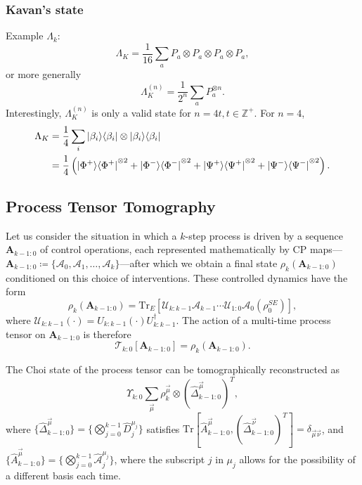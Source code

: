 \documentclass{article}
\begin{document}
\subsubsection{Kavan's state}
Example $\Lambda_k$:
\begin{equation}
    \Lambda_K = \frac{1}{16}\sum_a P_a \otimes P_a \otimes P_a \otimes P_a,
\end{equation}
or more generally
\begin{equation}
    \Lambda_K^{(n)}  = \frac{1}{2^n}\sum_a P_a^{\otimes n}.
\end{equation}
Interestingly, $\Lambda_K^{(n)}$ is only a valid state for $n = 4t, t\in \mathbb{Z^+}$. For $n=4$,
\begin{equation}
    \begin{split}
        \Lambda_K &= \frac{1}{4}\sum_i\ket{\beta_i}\!\bra{\beta_i}\otimes \ket{\beta_i}\!\bra{\beta_i} \\
        &= \frac{1}{4} \left(\ket{\Phi^+}\!\bra{\Phi^+}^{\otimes 2} + \ket{\Phi^-}\!\bra{\Phi^-}^{\otimes 2} + \ket{\Psi^+}\!\bra{\Psi^+}^{\otimes 2} + \ket{\Psi^-}\!\bra{\Psi^-}^{\otimes 2}\right).
    \end{split}
\end{equation}

\subsection{Process Tensor Tomography}
Let us consider the situation in which
a $k$-step process is driven by a sequence $\mathbf{A}_{k-1:0}$ of control operations, each represented mathematically by CP maps—$\mathbf{A}_{k-1:0} \coloneqq \{\mathcal{A}_0, \mathcal{A}_1,\dots, \mathcal{A}_k\}$—after which we obtain a final state $\rho_k(\mathbf{A}_{k-1:0})$ conditioned on this choice of interventions. These controlled dynamics have the form
$$
\rho_k(\mathbf{A}_{k-1:0}) = \text{Tr}_E[\mathcal{U}_{k:k-1}\mathcal{A}_{k-1}\cdots \mathcal{U}_{1:0}\mathcal{A}_0(\rho_0^{SE})],
$$
where $\mathcal{U}_{k:k-1}(\cdot) = U_{k:k-1}(\cdot)U_{k:k-1}^\dagger$. The action of a multi-time process tensor on $\mathbf{A}_{k-1:0}$ is therefore
$$
\mathcal{T}_{k:0}[\mathbf{A}_{k-1:0}] = \rho_k(\mathbf{A}_{k-1:0}).
$$

The Choi state of the process tensor can be tomographically reconstructed as
$$
\Upsilon_{k:0} \sum_{\vec{\mu}}\rho_k^{\vec{\mu}} \otimes (\hat{\Delta}_{k-1:0}^{\vec{\mu}})^T,
$$
where $\{\hat{\Delta}_{k-1:0}^{\vec{\mu}}\} = \{\bigotimes_{j=0}^{k-1}\hat{D}_j^{\mu_j}\}$ satisfies $\text{Tr}[\hat{A}^{\vec{\mu}}_{k-1:0}, (\hat{\Delta}_{k-1:0}^{\vec{\nu}})^T]=\delta_{\vec{\mu}\vec{\nu}}$, and $\{\hat{A}^{\vec{\mu}}_{k-1:0}\}=\{\bigotimes_{j=0}^{k-1}\hat{\mathcal{A}}_j^{\mu_j}\}$, where the subscript $j$ in $\mu_j$ allows for the possibility of a different basis each time.
\end{document}
